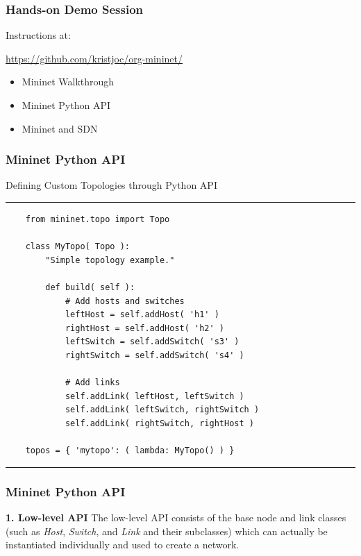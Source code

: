 \documentclass{beamer}
\begin{document}
\begin{frame}
  \frametitle{Hands-on Demo Session}
  \begin{block}{Instructions at:}

    \url{https://github.com/kristjoc/org-mininet/}
  \end{block}
\end{frame}
\begin{frame}[plain]
  \begin{itemize}
  \item[] {\color{gray}Mininet Walkthrough}
    \vspace{1cm}
  \item[]
    \begin{large}
      Mininet Python API
    \end{large}
    \vspace{1cm}
  \item[] {\color{gray}Mininet and SDN}
  \end{itemize}
  \addtocounter{framenumber}{-1}
\end{frame}
\begin{frame}[fragile]
  \frametitle{Mininet Python API}

  \begin{block}{Defining Custom Topologies through Python API}
    \rule{0.5\textwidth}{0.5pt}
    \scriptsize
\begin{verbatim}
    from mininet.topo import Topo

    class MyTopo( Topo ):
        "Simple topology example."

        def build( self ):
            # Add hosts and switches
            leftHost = self.addHost( 'h1' )
            rightHost = self.addHost( 'h2' )
            leftSwitch = self.addSwitch( 's3' )
            rightSwitch = self.addSwitch( 's4' )

            # Add links
            self.addLink( leftHost, leftSwitch )
            self.addLink( leftSwitch, rightSwitch )
            self.addLink( rightSwitch, rightHost )

    topos = { 'mytopo': ( lambda: MyTopo() ) }
\end{verbatim}
    \rule{0.5\textwidth}{0.5pt}
  \end{block}
\end{frame}
\begin{frame}
  \frametitle{Mininet Python API}

  \begin{block}{\textbf{1. Low-level API}}
    The low-level API consists of the base node and link classes (such
    as \textit{Host}, \textit{Switch}, and \textit{Link} and their
    subclasses) which can actually be instantiated individually and
    used to create a network.
  \end{block}
\end{frame}
\end{document}

